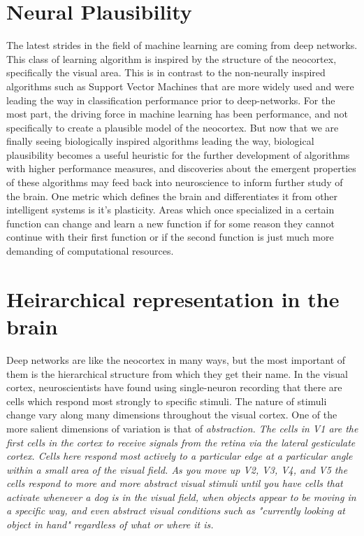 \documentclass[12pt]{article}
\begin{document}
	\section{Neural Plausibility}
		The latest strides in the field of machine learning are coming from deep networks. This class of learning algorithm is inspired by the structure of the neocortex, specifically the visual area. This is in contrast to the non-neurally inspired algorithms such as Support Vector Machines that are more widely used and were leading the way in classification performance prior to deep-networks. For the most part, the driving force in machine learning has been performance, and not specifically to create a plausible model of the neocortex. But now that we are finally seeing biologically inspired algorithms leading the way, biological plausibility becomes a useful heuristic for the further development of algorithms with higher performance measures, and discoveries about the emergent properties of these algorithms may feed back into neuroscience to inform further study of the brain. 
		One metric which defines the brain and differentiates it from other intelligent systems is it's plasticity. Areas which once specialized in a certain function can change and learn a new function if for some reason they cannot continue with their first function or if the second function is just much more demanding of computational resources.
	\section{Heirarchical representation in the brain}
	
		Deep networks are like the neocortex in many ways, but the most important of them is the hierarchical structure from which they get their name. In the visual cortex, neuroscientists have found using single-neuron recording that there are cells which respond most strongly to specific stimuli. The nature of stimuli change vary along many dimensions throughout the visual cortex. One of the more salient dimensions of variation is that of \em{abstraction}. The cells in V1 are the first cells in the cortex to receive signals from the retina via the lateral gesticulate cortex. Cells here respond most actively to a particular edge at a particular angle within a small area of the visual field. As you move up V2, V3, V4, and V5 the cells respond to more and more abstract visual stimuli until you have cells that activate whenever a dog is in the visual field, when objects appear to be moving in a specific way, and even abstract visual conditions such as "currently looking at object in hand" regardless of what or where it is. 
\end{document}
